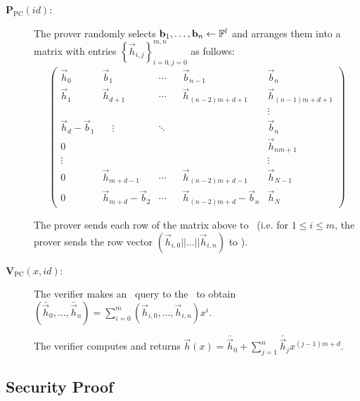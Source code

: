 \begin{description} \label{protpolycommit}
\item[$\textbf{P}_\mathrm{PC}(id)$:]
The prover randomly selects $\mathbf{b}_{1},\ldots,\mathbf{b}_{n} \gets \mathbb{F}^l$ and arranges them into a matrix with entries $\left\{\vec{h}_{i,j}\right\}_{i=0,j=0}^{m,n}$ as follows:
$$\left(\begin{array}{lllll}
\vec{h}_0 & \vec{b}_{1} & \cdots & \vec{b}_{n-1} & \vec{b}_n \\
\vec{h}_1 & \vec{h}_{d+1} & \cdots & \vec{h}_{(n-2)m+d+1} & \vec{h}_{(n-1)m+d+1}\\
&&&& \vdots \\
\vec{h}_d-\vec{b}_1 & \quad \vdots & \ddots \quad & & \vec{b}_n\\
0 &&&& \vec{h}_{nm+1}\\
\vdots &&&& \vdots  \\
0 & \vec{h}_{m+d-1}  & \cdots  & \vec{h}_{(n-2)m+d-1} & \vec{h}_{N-1} \\
0 & \vec{h}_{m+d}-\vec{b}_2 & \cdots & \vec{h}_{(n-2)m+d}-\vec{b}_n & \vec{h}_{N}
\end{array} \right)$$

The prover sends each row of the matrix above to \ILC\ (i.e. for $1 \leq i \leq m$, the prover sends the row vector $(\vec{h}_{i,0}||\ldots||\vec{h}_{i,n})$ to \ILC).

\item[$\textbf{V}_\mathrm{PC}(x,id)$:]

The verifier makes an \ILCopen\ query to the \ILC\ to obtain $(\bar{\vec{h}}_0,\ldots,\bar{\vec{h}}_n) = \sum_{i=0}^{m} (\vec{h}_{i,0},\ldots,\vec{h}_{i,n}) x^i$.

The verifier computes and returns $\vec{h}(x) = \bar{\vec{h}}_0+\sum_{j=1}^{n} \bar{\vec{h}}_{j} x^{(j-1)m+d}$.

\end{description}

\subsection{Security Proof}

